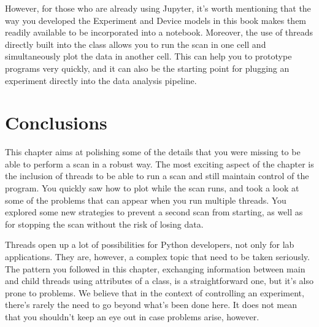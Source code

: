 However, for those who are already using Jupyter, it's worth mentioning that the way you developed the Experiment and Device models in this book makes them readily available to be incorporated into a notebook. Moreover, the use of threads directly built into the class allows you to run the scan in one cell and simultaneously plot the data in another cell. This can help you to prototype programs very quickly, and it can also be the starting point for plugging an experiment directly into the data analysis pipeline.

\section{Conclusions}\label{sec:conclusions-run-experiment}
This chapter aims at polishing some of the details that you were missing to be able to perform a scan in a robust way. The most exciting aspect of the chapter is the inclusion of threads to be able to run a scan and still maintain control of the program. You quickly saw how to plot while the scan runs, and took a look at some of the problems that can appear when you run multiple threads. You explored some new strategies to prevent a second scan from starting, as well as for stopping the scan without the risk of losing data.

Threads open up a lot of possibilities for Python developers, not only for lab applications. They are, however, a complex topic that need to be taken seriously. The pattern you followed in this chapter, exchanging information between main and child threads using attributes of a class, is a straightforward one, but it's also prone to problems. We believe that in the context of controlling an experiment, there's rarely the need to go beyond what's been done here. It does not mean that you shouldn't keep an eye out in case problems arise, however.
